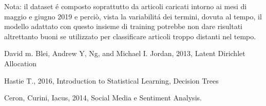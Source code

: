 \documentclass[runningheads]{llncs}
\begin{document}
Nota: il dataset \'e composto soprattutto da articoli caricati intorno ai mesi di maggio e giugno 2019 e perciò, vista la variabilit\'a dei termini, dovuta al tempo, il modello adattato con questo insieme di training potrebbe non dare risultati altrettanto buoni se utilizzato per classificare articoli troppo distanti nel tempo.


%
%
%

\begin{thebibliography}{9}

David m. Blei, Andrew Y, Ng, and Michael I. Jordan, 2013, Latent Dirichlet Allocation

Hastie T., 2016, Introduction to Statistical Learning, Decision Trees

Ceron, Curini, Iacus, 2014,  Social Media e Sentiment Analysis.


\end{thebibliography}
\end{document}
